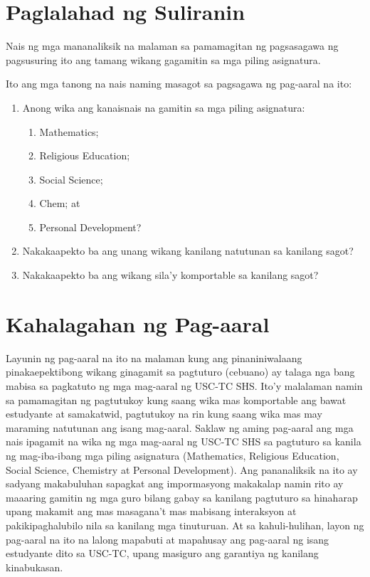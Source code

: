 \documentclass [11pt] {report}
\begin{document}
\section {Paglalahad ng Suliranin}
Nais ng mga mananaliksik na malaman sa pamamagitan ng pagsasagawa ng pagsusuring
ito ang tamang wikang gagamitin sa mga piling asignatura.

Ito ang mga tanong na nais naming masagot sa pagsagawa ng pag-aaral na ito:

\begin{enumerate}[parsep=\baselineskip,itemsep=-0.5\baselineskip]
\item Anong wika ang kanaisnais na gamitin sa mga piling asignatura:
  \begin{enumerate}[nosep]
  \item Mathematics;
  \item Religious Education;
  \item Social Science;
  \item Chem; at
  \item Personal Development?
  \end{enumerate}
\item Nakakaapekto ba ang unang wikang kanilang natutunan sa kanilang sagot?
\item Nakakaapekto ba ang wikang sila'y komportable sa kanilang sagot?
\end{enumerate}


\section{Kahalagahan ng Pag-aaral}
Layunin ng pag-aaral na ito na malaman kung ang pinaniniwalaang pinakaepektibong
wikang ginagamit sa pagtuturo (\gls{cebuano}) ay talaga nga bang mabisa sa
pagkatuto ng mga mag-aaral ng USC-TC SHS. Ito'y malalaman namin sa pamamagitan
ng pagtutukoy kung saang wika mas komportable ang bawat estudyante at
samakatwid, pagtutukoy na rin kung saang wika mas may maraming natutunan ang
isang mag-aaral. Saklaw ng aming pag-aaral ang mga nais ipagamit na wika ng mga
mag-aaral ng USC-TC SHS sa pagtuturo sa kanila ng mag-iba-ibang mga piling
asignatura (Mathematics, Religious Education, Social Science, Chemistry at
Personal Development). Ang pananaliksik na ito ay sadyang makabuluhan sapagkat
ang impormasyong makakalap namin rito ay maaaring gamitin ng mga guro bilang
gabay sa kanilang pagtuturo sa hinaharap upang makamit ang mas masagana't mas
mabisang interaksyon at pakikipaghalubilo nila sa kanilang mga tinuturuan. At sa
kahuli-hulihan, layon ng pag-aaral na ito na lalong mapabuti at mapahusay ang
pag-aaral ng isang estudyante dito sa USC-TC, upang masiguro ang garantiya ng
kanilang kinabukasan.
\end{document}
